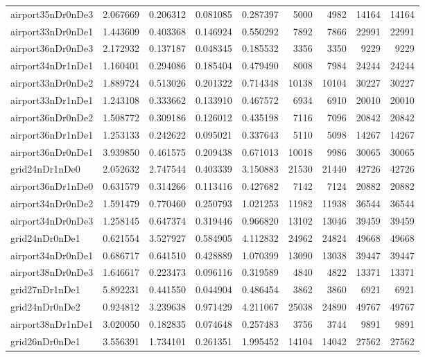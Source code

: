 \begin{longtable}{|l|r|r|r|r|r|r|r|r|}
airport35nDr0nDe3 & 2.067669 & 0.206312 & 0.081085 & 0.287397 & 5000 & 4982 & 14164 & 14164 \\
airport33nDr0nDe1 & 1.443609 & 0.403368 & 0.146924 & 0.550292 & 7892 & 7866 & 22991 & 22991 \\
airport36nDr0nDe3 & 2.172932 & 0.137187 & 0.048345 & 0.185532 & 3356 & 3350 & 9229 & 9229 \\
airport34nDr1nDe1 & 1.160401 & 0.294086 & 0.185404 & 0.479490 & 8008 & 7984 & 24244 & 24244 \\
airport33nDr0nDe2 & 1.889724 & 0.513026 & 0.201322 & 0.714348 & 10138 & 10104 & 30227 & 30227 \\
airport33nDr1nDe1 & 1.243108 & 0.333662 & 0.133910 & 0.467572 & 6934 & 6910 & 20010 & 20010 \\
airport36nDr0nDe2 & 1.508772 & 0.309186 & 0.126012 & 0.435198 & 7116 & 7096 & 20842 & 20842 \\
airport36nDr1nDe1 & 1.253133 & 0.242622 & 0.095021 & 0.337643 & 5110 & 5098 & 14267 & 14267 \\
airport36nDr0nDe1 & 3.939850 & 0.461575 & 0.209438 & 0.671013 & 10018 & 9986 & 30065 & 30065 \\
grid24nDr1nDe0 & 2.052632 & 2.747544 & 0.403339 & 3.150883 & 21530 & 21440 & 42726 & 42726 \\
airport36nDr1nDe0 & 0.631579 & 0.314266 & 0.113416 & 0.427682 & 7142 & 7124 & 20882 & 20882 \\
airport34nDr0nDe2 & 1.591479 & 0.770460 & 0.250793 & 1.021253 & 11982 & 11938 & 36544 & 36544 \\
airport34nDr0nDe3 & 1.258145 & 0.647374 & 0.319446 & 0.966820 & 13102 & 13046 & 39459 & 39459 \\
grid24nDr0nDe1 & 0.621554 & 3.527927 & 0.584905 & 4.112832 & 24962 & 24824 & 49668 & 49668 \\
airport34nDr0nDe1 & 0.686717 & 0.641510 & 0.428889 & 1.070399 & 13090 & 13038 & 39447 & 39447 \\
airport38nDr0nDe3 & 1.646617 & 0.223473 & 0.096116 & 0.319589 & 4840 & 4822 & 13371 & 13371 \\
grid27nDr1nDe1 & 5.892231 & 0.441550 & 0.044904 & 0.486454 & 3862 & 3860 & 6921 & 6921 \\
grid24nDr0nDe2 & 0.924812 & 3.239638 & 0.971429 & 4.211067 & 25038 & 24890 & 49767 & 49767 \\
airport38nDr1nDe1 & 3.020050 & 0.182835 & 0.074648 & 0.257483 & 3756 & 3744 & 9891 & 9891 \\
grid26nDr0nDe1 & 3.556391 & 1.734101 & 0.261351 & 1.995452 & 14104 & 14042 & 27562 & 27562 \\

\end{longtable}
